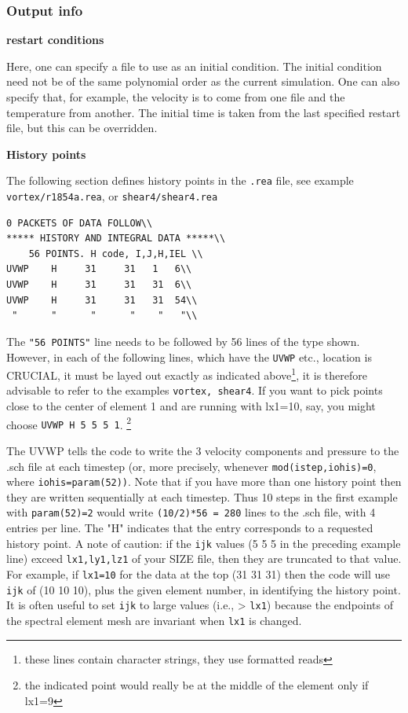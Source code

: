 \subsubsection*{ Output info} 
\begin{description}
\item{\bf restart conditions} 

     Here, one can specify a file to use as an initial condition.
     The initial condition need not be of the same polynomial order
     as the current simulation.   One can also specify that, for example,
     the velocity is to come from one file and the temperature from another.
     The initial time is taken from the last specified restart file, but 
     this can be overridden.
\item{\bf History points}

The following section defines history points in the {\tt .rea} file, see example {\tt vortex/r1854a.rea}, or {\tt shear4/shear4.rea}
\begin{verbatim}
0 PACKETS OF DATA FOLLOW\\
***** HISTORY AND INTEGRAL DATA *****\\
    56 POINTS. H code, I,J,H,IEL \\
UVWP    H     31     31   1   6\\
UVWP    H     31     31   31  6\\
UVWP    H     31     31   31  54\\
 "      "      "      "    "   "\\
\end{verbatim}

The {\tt "56 POINTS"} line needs to be followed by 56 lines of the type shown. However, in each of the following lines, which have the {\tt UVWP} etc., location is CRUCIAL, it
must be layed out exactly as indicated above\footnote{these lines contain character strings, they use formatted reads}, it is therefore advisable to refer to the examples {\tt vortex, shear4}.  If you want to pick points close to the center of element 1 and are running with lx1=10, say, you might choose {\tt UVWP H 5 5 5 1}. \footnote{the indicated point would really be at the middle of the element only if lx1=9}

The UVWP tells the code to write the 3 velocity components and pressure to the .sch file at
each timestep (or, more precisely, whenever {\tt mod(istep,iohis)=0}, where {\tt iohis=param(52))}.
Note that if you have more than one history point then they are written sequentially at each
timestep. Thus 10 steps in the first example with {\tt param(52)=2} would write {\tt (10/2)*56 = 280}
lines to the .sch file, with 4 entries per line. The "H" indicates that the entry corresponds to a requested history point. A note of caution: if the {\tt ijk} values (5 5 5 in the preceding example line) exceed {\tt lx1,ly1,lz1} of your SIZE file, then they are truncated to that value. For example, if {\tt lx1=10} for the data at the top (31 31 31) then the code will use {\tt ijk} of (10 10 10), plus the given element number, in identifying the history point. It is often useful to set {\tt ijk} to large values (i.e., > {\tt lx1}) because the endpoints of the spectral element mesh are invariant when {\tt lx1} is changed. 


\end{description}

